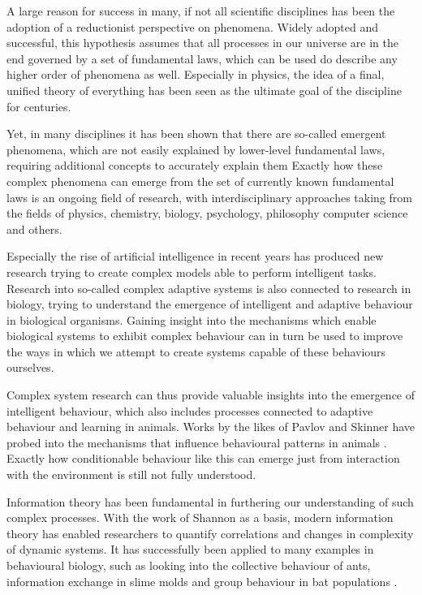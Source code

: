 \documentclass[12pt,a4paper]{article}
\begin{document}
A large reason for success in many, if not all scientific disciplines has been the adoption of a reductionist perspective on phenomena.
Widely adopted and successful, this hypothesis assumes that all processes in our universe are in the end governed by a set of fundamental laws, which can be used do describe any higher order of phenomena as well.
Especially in physics, the idea of a final, unified theory of everything has been seen as the ultimate goal of the discipline for centuries.

Yet, in many disciplines it has been shown that there are so-called emergent phenomena, which are not easily explained by lower-level fundamental laws, requiring additional concepts to accurately explain them \autocite{anderson1972more}
Exactly how these complex phenomena can emerge from the set of currently known fundamental laws is an ongoing field of research, with interdisciplinary approaches taking from the fields of physics, chemistry, biology, psychology, philosophy computer science and others.

Especially the rise of artificial intelligence in recent years has produced new research trying to create complex models able to perform intelligent tasks.
Research into  so-called complex adaptive systems is also connected to research in biology, trying to understand the emergence of intelligent and adaptive behaviour in biological organisms. Gaining insight into the mechanisms which enable biological systems to exhibit complex behaviour can in turn be used to improve the ways in which we attempt to create systems capable of these behaviours ourselves.

Complex system research can thus provide valuable insights into the emergence of intelligent behaviour, which also includes processes connected to adaptive behaviour and learning in animals. Works by the likes of Pavlov and Skinner have probed into the mechanisms that influence behavioural patterns in animals \autocite{pavlov1906scientific, skinner1957experimental}. Exactly how conditionable behaviour like this can emerge just from interaction with the environment is still not fully understood.

Information theory has been fundamental in furthering our understanding of such complex processes. With the work of Shannon \autocite{shannon1948} as a basis, modern information theory has enabled researchers to quantify correlations and changes in complexity of dynamic systems. It has successfully been applied to many examples in behavioural biology, such as looking into the collective behaviour of ants, information exchange in slime molds and group behaviour in bat populations \autocite{kim2021informational}.
\end{document}
